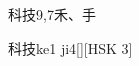 \begin{entry}{科技}{9,7}{⽲、⼿}
  \begin{phonetics}{科技}{ke1 ji4}[][HSK 3]
  \end{phonetics}
\end{entry}
